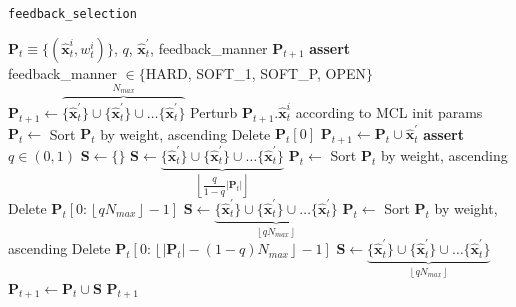 \begin{algorithm}
  \caption{\texttt{feedback\_selection}}
  \begin{spacing}{1.2}
  \begin{algorithmic}[1]
    \REQUIRE $\bm{P}_t \equiv \{(\hat{\bm{x}}_t^i, w_t^i)\}$, $q$, $\hat{\bm{x}}^\prime_t$, feedback\_manner
    \ENSURE $\bm{P}_{t+1}$
    \STATE \textbf{assert} \\ feedback\_manner $\in \{$HARD, SOFT\_1, SOFT\_P, OPEN$\}$
      \STATE $\bm{P}_{t+1} \leftarrow \overbrace{\{\hat{\bm{x}}^\prime_t\} \cup \{\hat{\bm{x}}^\prime_t\} \cup \dots \{\hat{\bm{x}}^\prime_t\}}^{N_{max}}$
      \STATE Perturb $\bm{P}_{t+1}.\hat{\bm{x}}_t^i$ according to MCL init params
    \ENDIF
        \STATE $\bm{P}_t \leftarrow$ Sort $\bm{P}_t$ by weight, ascending
        \STATE Delete $\bm{P}_t[0]$
      \ENDIF
      \STATE $\bm{\bm{P}}_{t+1} \leftarrow \bm{P}_t \cup \hat{\bm{x}}^\prime_t$
    \ENDIF
      \STATE \textbf{assert} $q \in (0,1)$
      \STATE $\bm{S} \leftarrow \{\}$
        \STATE $\bm{S} \leftarrow \underbrace{\{\hat{\bm{x}}^\prime_t\} \cup \{\hat{\bm{x}}^\prime_t\} \cup \dots \{\hat{\bm{x}}^\prime_t\}}_{\left\lfloor\dfrac{q}{1-q}|\bm{P}_t|\right\rfloor}$
        \STATE $\bm{P}_t \leftarrow$ Sort $\bm{P}_t$ by weight, ascending
        \STATE Delete $\bm{P}_t[0: \left\lfloor qN_{max} \right\rfloor-1]$
        \STATE $\bm{S} \leftarrow \underbrace{\{\hat{\bm{x}}^\prime_t\} \cup \{\hat{\bm{x}}^\prime_t\} \cup \dots \{\hat{\bm{x}}^\prime_t\}}_{\left\lfloor qN_{max}\right\rfloor}$
      \ELSE
        \STATE $\bm{P}_t \leftarrow$ Sort $\bm{P}_t$ by weight, ascending
        \STATE Delete $\bm{P}_t[0: \left\lfloor |\bm{P}_t| - (1-q)N_{max} \right\rfloor-1]$
        \STATE $\bm{S} \leftarrow \underbrace{\{\hat{\bm{x}}^\prime_t\} \cup \{\hat{\bm{x}}^\prime_t\} \cup \dots \{\hat{\bm{x}}^\prime_t\}}_{\left\lfloor qN_{max}\right\rfloor}$
      \ENDIF
      \STATE $\bm{P}_{t+1} \leftarrow \bm{P}_{t} \cup \bm{S}$
    \ENDIF
    \ENDIF
    \RETURN $\bm{P}_{t+1}$
  \end{algorithmic}
  \end{spacing}
  \label{alg:feedback_selection}
\end{algorithm}



